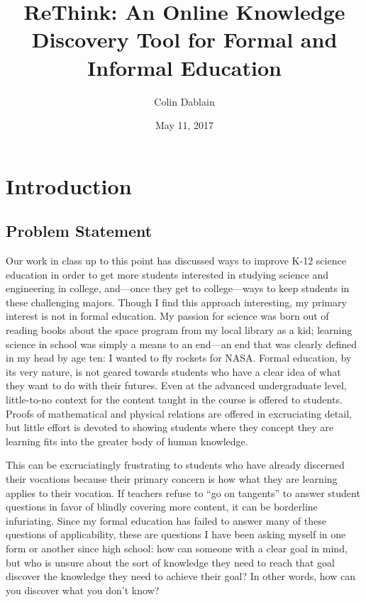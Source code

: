 \documentclass[man, 12pt, floatsintext, donotrepeattitle]{apa6}
\begin{document}
\title{ReThink: An Online Knowledge Discovery Tool for Formal and Informal Education}
\author{Colin Dablain}
\date{May 11, 2017}
\maketitle

\tableofcontents
\listoffigures
\lstlistoflistings
\newpage


\section{Introduction}
\subsection{Problem Statement}
Our work in class up to this point has discussed ways to improve K-12 science
education in order to get more students interested in studying science and
engineering in college, and---once they get to college---ways to keep students in
these challenging majors.  Though I find this approach interesting, my primary
interest is not in formal education.  My passion for science was born out of
reading books about the space program from my local library as a kid; learning
science in school was simply a means to an end---an end that was clearly defined
in my head by age ten: I wanted to fly rockets for NASA. Formal education, by
its very nature, is not geared towards students who have a clear idea of what
they want to do with their futures.  Even at the advanced undergraduate level,
little-to-no context for the content taught in the course is offered to
students.  Proofs of mathematical and physical relations are offered in
excruciating detail, but little effort is devoted to showing students where
they concept they are learning fits into the greater body of human knowledge.

This can be excruciatingly frustrating to students who have already discerned
their vocations because their primary concern is how what they are learning
applies to their vocation.  If teachers refuse to ``go on tangents'' to answer
student questions in favor of blindly covering more content, it can be
borderline infuriating.  Since my formal education has failed to answer many of
these questions of applicability, these are questions I have been asking myself
in one form or another since high school: how can someone with a clear goal in
mind, but who is unsure about the sort of knowledge they need to reach that
goal discover the knowledge they need to achieve their goal?  In other words,
how can you discover what you don't know?
\end{document}
